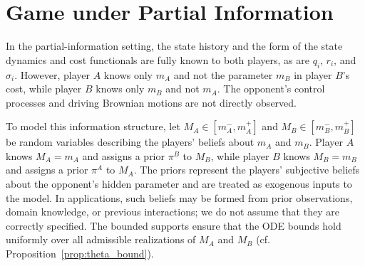 \documentclass[letterpaper, 10 pt, conference]{ieeeconf}
\begin{document}


 \section{Game under Partial Information}\label{sec:partial_info}

In the partial-information setting, the state history and the form of the state dynamics and cost functionals are fully known to both players, as are $q_i$, $r_i$, and $\sigma_i$.  However, player $A$ knows only $m_A$ and not the parameter $m_B$ in player $B$'s cost, while player $B$ knows only $m_B$ and not $m_A$.  The opponent's control processes and driving Brownian motions are not directly observed.

To model this information structure, let $M_A \in [m_A^-, m_A^+]$ and $M_B \in [m_B^-, m_B^+]$ be random variables describing the players' beliefs about $m_A$ and $m_B$. Player $A$ knows $M_A = m_A$ and assigns a prior $\pi^B$ to $M_B$, while player $B$ knows $M_B = m_B$ and assigns a prior $\pi^A$ to $M_A$. The priors represent the players' subjective beliefs about the opponent's hidden parameter and are treated as exogenous inputs to the model. In applications, such beliefs may be formed from prior observations, domain knowledge, or previous interactions; we do not assume that they are correctly specified. The bounded supports ensure that the ODE bounds hold uniformly over all admissible realizations of $M_A$ and $M_B$ (cf. Proposition~\ref{prop:theta_bound}).
\end{document}
